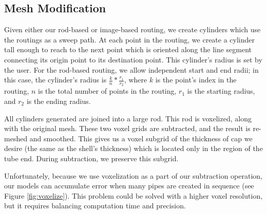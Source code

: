 
\subsection{Mesh Modification}

Given either our rod-based or image-based routing, we create cylinders which use the routings as a sweep path.  At each point in the routing, we create a cylinder tall enough to reach to the next point which is oriented along the line segment connecting its origin point to its destination point.  This cylinder's radius is set by the user.  For the rod-based routing, we allow independent start and end radii; in this case, the cylinder's radius is $\frac{k}{n}*\frac{r_1}{r_2}$, where $k$ is the point's index in the routing, $n$ is the total number of points in the routing, $r_1$ is the starting radius, and $r_2$ is the ending radius.

All cylinders generated are joined into a large rod.  This rod is voxelized, along with the original mesh.  These two voxel grids are subtracted, and the result is re-meshed and smoothed.    This gives us a voxel subgrid of the thickness of cap we desire (the same as the shell's thickness) which is located only in the region of the tube end.  During subtraction, we preserve this subgrid. 

Unfortunately, because we use voxelization as a part of our subtraction operation, our models can accumulate error when many pipes are created in sequence (see Figure \ref{fig:voxelize}).  This problem could be solved with a higher voxel resolution, but it requires balancing computation time and precision.

